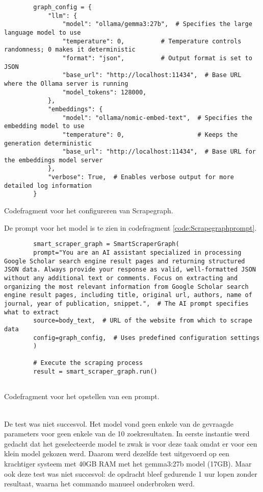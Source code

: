 \begin{listing}
    \begin{verbatim}
        graph_config = {
            "llm": {
                "model": "ollama/gemma3:27b",  # Specifies the large language model to use
                "temperature": 0,          # Temperature controls randomness; 0 makes it deterministic
                "format": "json",          # Output format is set to JSON
                "base_url": "http://localhost:11434",  # Base URL where the Ollama server is running
                "model_tokens": 128000,
            },
            "embeddings": {
                "model": "ollama/nomic-embed-text",  # Specifies the embedding model to use
                "temperature": 0,                    # Keeps the generation deterministic
                "base_url": "http://localhost:11434",  # Base URL for the embeddings model server
            },
            "verbose": True,  # Enables verbose output for more detailed log information
        }
    \end{verbatim}
    \caption[Scrapegraph configuratie codefragment]{Codefragment voor het configureren van Scrapegraph.}
    \label{code:Scrapegraphconfig}
\end{listing}
De prompt voor het model is te zien in codefragment \ref{code:Scrapegraphprompt}.
\begin{listing}
    \begin{verbatim}
        smart_scraper_graph = SmartScraperGraph(
        prompt="You are an AI assistant specialized in processing Google Scholar search engine result pages and returning structured JSON data. Always provide your response as valid, well-formatted JSON without any additional text or comments. Focus on extracting and organizing the most relevant information from Google Scholar search engine result pages, including title, original url, authors, name of journal, year of publication, snippet.",  # The AI prompt specifies what to extract
        source=body_text,  # URL of the website from which to scrape data
        config=graph_config,  # Uses predefined configuration settings
        )
        
        # Execute the scraping process
        result = smart_scraper_graph.run()
        
    \end{verbatim}
    \caption[Prompt codefragment]{Codefragment voor het opstellen van een prompt.}
    \label{code:Scrapegraphprompt}
\end{listing}
\\
De test was niet succesvol. Het model vond geen enkele van de gevraagde parameters voor geen enkele van de 10 zoekresultaten.
In eerste instantie werd gedacht dat het geselecteerde model te zwak is voor deze taak omdat er voor een klein model gekozen werd. Daarom werd dezelfde test uitgevoerd op een krachtiger systeem met 40GB RAM met het gemma3:27b model (17GB). Maar ook deze test was niet succesvol: de opdracht bleef gedurende 1 uur lopen zonder resultaat, waarna het commando manueel onderbroken werd. 
